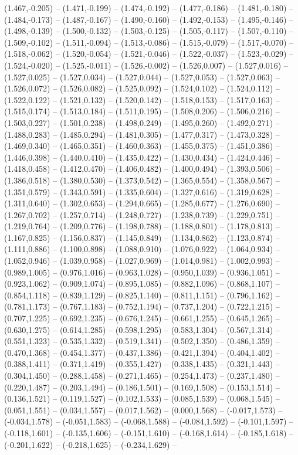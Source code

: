 (1.467,-0.205) -- (1.471,-0.199) -- (1.474,-0.192) -- (1.477,-0.186) -- (1.481,-0.180) -- (1.484,-0.173) -- (1.487,-0.167) -- (1.490,-0.160) -- (1.492,-0.153) -- (1.495,-0.146) -- (1.498,-0.139) -- (1.500,-0.132) -- (1.503,-0.125) -- (1.505,-0.117) -- (1.507,-0.110) -- (1.509,-0.102) -- (1.511,-0.094) -- (1.513,-0.086) -- (1.515,-0.079) -- (1.517,-0.070) -- (1.518,-0.062) -- (1.520,-0.054) -- (1.521,-0.046) -- (1.522,-0.037) -- (1.523,-0.029) -- (1.524,-0.020) -- (1.525,-0.011) -- (1.526,-0.002) -- (1.526,0.007) -- (1.527,0.016) -- (1.527,0.025) -- (1.527,0.034) -- (1.527,0.044) -- (1.527,0.053) -- (1.527,0.063) -- (1.526,0.072) -- (1.526,0.082) -- (1.525,0.092) -- (1.524,0.102) -- (1.524,0.112) -- (1.522,0.122) -- (1.521,0.132) -- (1.520,0.142) -- (1.518,0.153) -- (1.517,0.163) -- (1.515,0.174) -- (1.513,0.184) -- (1.511,0.195) -- (1.508,0.206) -- (1.506,0.216) -- (1.503,0.227) -- (1.501,0.238) -- (1.498,0.249) -- (1.495,0.260) -- (1.492,0.271) -- (1.488,0.283) -- (1.485,0.294) -- (1.481,0.305) -- (1.477,0.317) -- (1.473,0.328) -- (1.469,0.340) -- (1.465,0.351) -- (1.460,0.363) -- (1.455,0.375) -- (1.451,0.386) -- (1.446,0.398) -- (1.440,0.410) -- (1.435,0.422) -- (1.430,0.434) -- (1.424,0.446) -- (1.418,0.458) -- (1.412,0.470) -- (1.406,0.482) -- (1.400,0.494) -- (1.393,0.506) -- (1.386,0.518) -- (1.380,0.530) -- (1.373,0.542) -- (1.365,0.554) -- (1.358,0.567) -- (1.351,0.579) -- (1.343,0.591) -- (1.335,0.604) -- (1.327,0.616) -- (1.319,0.628) -- (1.311,0.640) -- (1.302,0.653) -- (1.294,0.665) -- (1.285,0.677) -- (1.276,0.690) -- (1.267,0.702) -- (1.257,0.714) -- (1.248,0.727) -- (1.238,0.739) -- (1.229,0.751) -- (1.219,0.764) -- (1.209,0.776) -- (1.198,0.788) -- (1.188,0.801) -- (1.178,0.813) -- (1.167,0.825) -- (1.156,0.837) -- (1.145,0.849) -- (1.134,0.862) -- (1.123,0.874) -- (1.111,0.886) -- (1.100,0.898) -- (1.088,0.910) -- (1.076,0.922) -- (1.064,0.934) -- (1.052,0.946) -- (1.039,0.958) -- (1.027,0.969) -- (1.014,0.981) -- (1.002,0.993) -- (0.989,1.005) -- (0.976,1.016) -- (0.963,1.028) -- (0.950,1.039) -- (0.936,1.051) -- (0.923,1.062) -- (0.909,1.074) -- (0.895,1.085) -- (0.882,1.096) -- (0.868,1.107) -- (0.854,1.118) -- (0.839,1.129) -- (0.825,1.140) -- (0.811,1.151) -- (0.796,1.162) -- (0.781,1.173) -- (0.767,1.183) -- (0.752,1.194) -- (0.737,1.204) -- (0.722,1.215) -- (0.707,1.225) -- (0.692,1.235) -- (0.676,1.245) -- (0.661,1.255) -- (0.645,1.265) -- (0.630,1.275) -- (0.614,1.285) -- (0.598,1.295) -- (0.583,1.304) -- (0.567,1.314) -- (0.551,1.323) -- (0.535,1.332) -- (0.519,1.341) -- (0.502,1.350) -- (0.486,1.359) -- (0.470,1.368) -- (0.454,1.377) -- (0.437,1.386) -- (0.421,1.394) -- (0.404,1.402) -- (0.388,1.411) -- (0.371,1.419) -- (0.355,1.427) -- (0.338,1.435) -- (0.321,1.443) -- (0.304,1.450) -- (0.288,1.458) -- (0.271,1.465) -- (0.254,1.473) -- (0.237,1.480) -- (0.220,1.487) -- (0.203,1.494) -- (0.186,1.501) -- (0.169,1.508) -- (0.153,1.514) -- (0.136,1.521) -- (0.119,1.527) -- (0.102,1.533) -- (0.085,1.539) -- (0.068,1.545) -- (0.051,1.551) -- (0.034,1.557) -- (0.017,1.562) -- (0.000,1.568) -- (-0.017,1.573) -- (-0.034,1.578) -- (-0.051,1.583) -- (-0.068,1.588) -- (-0.084,1.592) -- (-0.101,1.597) -- (-0.118,1.601) -- (-0.135,1.606) -- (-0.151,1.610) -- (-0.168,1.614) -- (-0.185,1.618) -- (-0.201,1.622) -- (-0.218,1.625) -- (-0.234,1.629) -- 